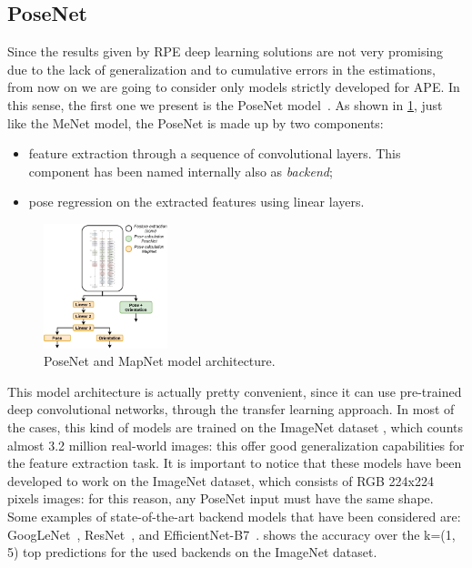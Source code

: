 \subsection{PoseNet}
Since the results given by RPE deep learning solutions are not very promising due to the lack of generalization and to cumulative errors in the estimations, from now on we are going to consider only models strictly developed for APE.
In this sense, the first one we present is the PoseNet model~\cite{9348762}.
As shown in \cref{fig:mapnet-posenet-structure}, just like the MeNet model, the PoseNet is made up by two components:
\begin{itemize}
    \item feature extraction through a sequence of convolutional layers. This component has been named internally also as \emph{backend};
    \item pose regression on the extracted features using linear layers.
\end{itemize}

\begin{figure}[htbp]
    \begin{center}
        \includegraphics[width=0.32\textwidth]{./imgs/mapnet_posenet_structure.png}
    \end{center}
    \caption{PoseNet and MapNet model architecture.}
    \label{fig:mapnet-posenet-structure}
\end{figure}

This model architecture is actually pretty convenient, since it can use pre-trained deep convolutional networks, through the transfer learning approach. In most of the cases, this kind of models are trained on the ImageNet dataset \cite{imagenet}, which counts almost 3.2 million real-world images: this offer good generalization capabilities for the feature extraction task.
It is important to notice that these models have been developed to work on the ImageNet dataset, which consists of RGB 224x224 pixels images: for this reason, any PoseNet input must have the same shape. 
Some examples of state-of-the-art backend models that have been considered are: GoogLeNet~\cite{googlenet}, ResNet~\cite{resnet}, and EfficientNet-B7~\cite{efficientnet}.  shows the accuracy over the k=(1, 5) top predictions for the used backends on the ImageNet dataset.

